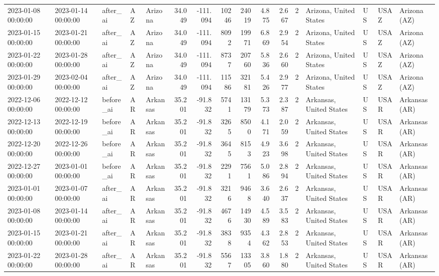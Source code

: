 \begin{tabular}{lllllrrrrrrlllll}
2023-01-08 00:00:00 & 2023-01-14 00:00:00 & after\_ai & AZ & Arizona & 34.049 & -111.094 & 10246 & 24019 & 4.875 & 2.667 & 2 & Arizona, United States & US & USAZ & Arizona (AZ) \\
2023-01-15 00:00:00 & 2023-01-21 00:00:00 & after\_ai & AZ & Arizona & 34.049 & -111.094 & 8092 & 19971 & 6.869 & 2.954 & 2 & Arizona, United States & US & USAZ & Arizona (AZ) \\
2023-01-22 00:00:00 & 2023-01-28 00:00:00 & after\_ai & AZ & Arizona & 34.049 & -111.094 & 8737 & 20760 & 5.836 & 2.660 & 2 & Arizona, United States & US & USAZ & Arizona (AZ) \\
2023-01-29 00:00:00 & 2023-02-04 00:00:00 & after\_ai & AZ & Arizona & 34.049 & -111.094 & 11586 & 32181 & 5.426 & 2.977 & 2 & Arizona, United States & US & USAZ & Arizona (AZ) \\
2022-12-06 00:00:00 & 2022-12-12 00:00:00 & before\_ai & AR & Arkansas & 35.201 & -91.832 & 5741 & 13179 & 5.373 & 2.387 & 2 & Arkansas, United States & US & USAR & Arkansas (AR) \\
2022-12-13 00:00:00 & 2022-12-19 00:00:00 & before\_ai & AR & Arkansas & 35.201 & -91.832 & 3265 & 8500 & 4.171 & 2.059 & 2 & Arkansas, United States & US & USAR & Arkansas (AR) \\
2022-12-20 00:00:00 & 2022-12-26 00:00:00 & before\_ai & AR & Arkansas & 35.201 & -91.832 & 3645 & 8153 & 4.923 & 3.698 & 2 & Arkansas, United States & US & USAR & Arkansas (AR) \\
2022-12-27 00:00:00 & 2023-01-01 00:00:00 & before\_ai & AR & Arkansas & 35.201 & -91.832 & 2291 & 7561 & 5.086 & 2.894 & 2 & Arkansas, United States & US & USAR & Arkansas (AR) \\
2023-01-01 00:00:00 & 2023-01-07 00:00:00 & after\_ai & AR & Arkansas & 35.201 & -91.832 & 3216 & 9468 & 3.640 & 2.637 & 2 & Arkansas, United States & US & USAR & Arkansas (AR) \\
2023-01-08 00:00:00 & 2023-01-14 00:00:00 & after\_ai & AR & Arkansas & 35.201 & -91.832 & 4676 & 14930 & 4.589 & 3.583 & 2 & Arkansas, United States & US & USAR & Arkansas (AR) \\
2023-01-15 00:00:00 & 2023-01-21 00:00:00 & after\_ai & AR & Arkansas & 35.201 & -91.832 & 3838 & 9354 & 4.362 & 2.853 & 2 & Arkansas, United States & US & USAR & Arkansas (AR) \\
2023-01-22 00:00:00 & 2023-01-28 00:00:00 & after\_ai & AR & Arkansas & 35.201 & -91.832 & 5567 & 13305 & 3.860 & 1.880 & 2 & Arkansas, United States & US & USAR & Arkansas (AR) \\

\end{tabular}
